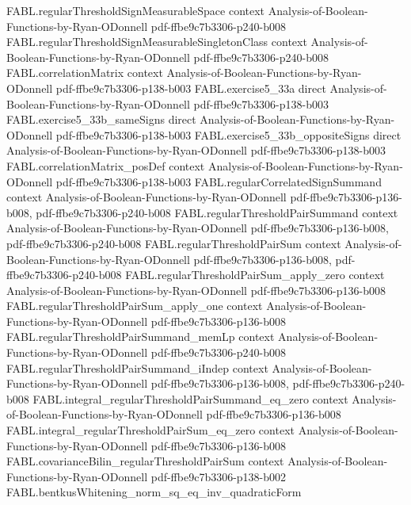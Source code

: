 \begin{theorem}
  {FABL.regularThresholdSignMeasurableSpace}
  {context}
  {Analysis-of-Boolean-Functions-by-Ryan-ODonnell}
  {pdf-ffbe9c7b3306-p240-b008}
\proofstep
  {FABL.regularThresholdSignMeasurableSingletonClass}
  {context}
  {Analysis-of-Boolean-Functions-by-Ryan-ODonnell}
  {pdf-ffbe9c7b3306-p240-b008}
\proofstep
  {FABL.correlationMatrix}
  {context}
  {Analysis-of-Boolean-Functions-by-Ryan-ODonnell}
  {pdf-ffbe9c7b3306-p138-b003}
\proofstep
  {FABL.exercise5_33a}
  {direct}
  {Analysis-of-Boolean-Functions-by-Ryan-ODonnell}
  {pdf-ffbe9c7b3306-p138-b003}
\proofstep
  {FABL.exercise5_33b_sameSigns}
  {direct}
  {Analysis-of-Boolean-Functions-by-Ryan-ODonnell}
  {pdf-ffbe9c7b3306-p138-b003}
\proofstep
  {FABL.exercise5_33b_oppositeSigns}
  {direct}
  {Analysis-of-Boolean-Functions-by-Ryan-ODonnell}
  {pdf-ffbe9c7b3306-p138-b003}
\proofstep
  {FABL.correlationMatrix_posDef}
  {context}
  {Analysis-of-Boolean-Functions-by-Ryan-ODonnell}
  {pdf-ffbe9c7b3306-p138-b003}
\proofstep
  {FABL.regularCorrelatedSignSummand}
  {context}
  {Analysis-of-Boolean-Functions-by-Ryan-ODonnell}
  {pdf-ffbe9c7b3306-p136-b008,
    pdf-ffbe9c7b3306-p240-b008}
\proofstep
  {FABL.regularThresholdPairSummand}
  {context}
  {Analysis-of-Boolean-Functions-by-Ryan-ODonnell}
  {pdf-ffbe9c7b3306-p136-b008,
    pdf-ffbe9c7b3306-p240-b008}
\proofstep
  {FABL.regularThresholdPairSum}
  {context}
  {Analysis-of-Boolean-Functions-by-Ryan-ODonnell}
  {pdf-ffbe9c7b3306-p136-b008,
    pdf-ffbe9c7b3306-p240-b008}
\proofstep
  {FABL.regularThresholdPairSum_apply_zero}
  {context}
  {Analysis-of-Boolean-Functions-by-Ryan-ODonnell}
  {pdf-ffbe9c7b3306-p136-b008}
\proofstep
  {FABL.regularThresholdPairSum_apply_one}
  {context}
  {Analysis-of-Boolean-Functions-by-Ryan-ODonnell}
  {pdf-ffbe9c7b3306-p136-b008}
\proofstep
  {FABL.regularThresholdPairSummand_memLp}
  {context}
  {Analysis-of-Boolean-Functions-by-Ryan-ODonnell}
  {pdf-ffbe9c7b3306-p240-b008}
\proofstep
  {FABL.regularThresholdPairSummand_iIndep}
  {context}
  {Analysis-of-Boolean-Functions-by-Ryan-ODonnell}
  {pdf-ffbe9c7b3306-p136-b008,
    pdf-ffbe9c7b3306-p240-b008}
\proofstep
  {FABL.integral_regularThresholdPairSummand_eq_zero}
  {context}
  {Analysis-of-Boolean-Functions-by-Ryan-ODonnell}
  {pdf-ffbe9c7b3306-p136-b008}
\proofstep
  {FABL.integral_regularThresholdPairSum_eq_zero}
  {context}
  {Analysis-of-Boolean-Functions-by-Ryan-ODonnell}
  {pdf-ffbe9c7b3306-p136-b008}
\proofstep
  {FABL.covarianceBilin_regularThresholdPairSum}
  {context}
  {Analysis-of-Boolean-Functions-by-Ryan-ODonnell}
  {pdf-ffbe9c7b3306-p138-b002}
\proofstep
  {FABL.bentkusWhitening_norm_sq_eq_inv_quadraticForm}

\end{theorem}

